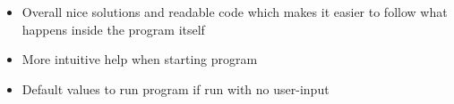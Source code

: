\documentclass[a4paper]{article}
\begin{document}
\begin{itemize}
	\item Overall nice solutions and readable code which makes it easier to follow what happens inside the program itself
	\item More intuitive help when starting program
	\item Default values to run program if run with no user-input
\end{itemize}



\end{document}
